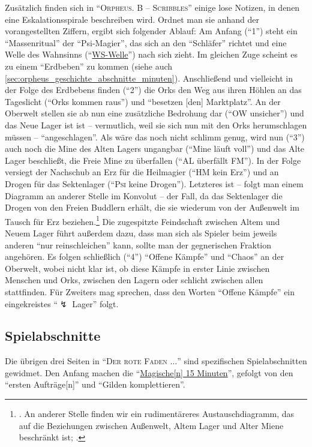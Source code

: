 \documentclass[a5paper,pagesize,numbers=noenddot]{scrbook}
\let\stmaryrdLightning\lightning
\begin{document}
Zusätzlich finden sich in \enquote{\textsc{Orpheus. B -- Scribbles}} einige lose Notizen, in denen eine Eskalationsspirale beschreiben wird.\autocite[Vgl.][S.~10]{orpheus_b_scribbles}
Ordnet man sie anhand der vorangestellten Ziffern, ergibt sich folgender Ablauf:
Am Anfang (\enquote{1}) steht ein \enquote{Massenritual} der \enquote{Psi-Magier}, das sich an den \enquote{Schläfer} richtet und eine Welle des Wahnsinns (\enquote{\uline{WS-Welle}}) nach sich zieht.
Im gleichen Zuge scheint es zu einem \enquote{Erdbeben} zu kommen (siehe auch \autoref{sec:orpheus_geschichte_abschnitte_minuten}).
Anschließend und vielleicht in der Folge des Erdbebens finden (\enquote{2}) die Orks den Weg aus ihren Höhlen an das Tageslicht (\enquote{Orks kommen raus}) und \enquote{besetzen [den] Marktplatz}.
An der Oberwelt stellen sie ab nun eine zusätzliche Bedrohung dar (\enquote{OW unsicher}) und das Neue Lager ist ist -- vermutlich, weil sie sich nun mit den Orks herumschlagen müssen -- \enquote{angeschlagen}.
Als wäre das noch nicht schlimm genug, wird nun (\enquote{3}) auch noch die Mine des Alten Lagers ungangbar (\enquote{Mine läuft voll}) und das Alte Lager beschließt, die Freie Mine zu überfallen (\enquote{AL überfällt FM}).
In der Folge versiegt der Nachschub an Erz für die Heilmagier (\enquote{HM kein Erz}) und an Drogen für das Sektenlager (\enquote{\textsc{Psi} keine Drogen}).
Letzteres ist -- folgt man einem Diagramm an anderer Stelle im Konvolut -- der Fall, da das Sektenlager die Drogen von den Freien Buddlern erhält, die sie wiederum von der Außenwelt im Tausch für Erz beziehen.\footnote{\autocite[Vgl.][S.~13]{orpheus_b_scribbles}. An anderer Stelle finden wir ein rudimentäreres Austauschdiagramm, das auf die Beziehungen zwischen Außenwelt, Altem Lager und Alter Miene beschränkt ist; \autocite[vgl.][S.~6]{orpheus_b_scribbles}.}
Die zugespitzte Feindschaft zwischen Altem und Neuem Lager führt außerdem dazu, dass man sich als Spieler beim jeweils anderen \enquote{nur reinschleichen} kann, sollte man der gegnerischen Fraktion angehören.
Es folgen schließlich (\enquote{4}) \enquote{Offene Kämpfe} und \enquote{Chaos} an der Oberwelt, wobei nicht klar ist, ob diese Kämpfe in erster Linie zwischen Menschen und Orks, zwischen den Lagern oder schlicht zwischen allen stattfinden.
Für Zweiters mag sprechen, dass den Worten \enquote{Offene Kämpfe} ein eingekreistes \enquote{$\stmaryrdLightning$ Lager} folgt.


\subsection{Spielabschnitte}\label{sec:orpheus_geschichte_abschnitte}
Die übrigen drei Seiten in \enquote{\textsc{Der rote Faden $\ldots$}} sind spezifischen Spielabschnitten gewidmet.
Den Anfang machen die \enquote{\uline{Magische[n] 15 Minuten}}, gefolgt von den \enquote{ersten Aufträge[n]} und \enquote{Gilden komplettieren}.
\end{document}
